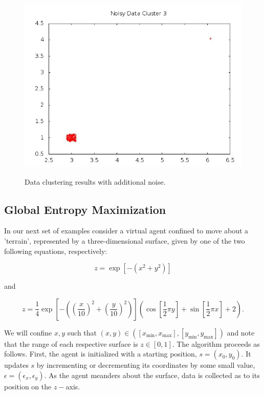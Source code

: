 \documentclass[english]{article}
\begin{document}
\begin{figure}
{\includegraphics[scale=0.25]{sparse_clusters2.jpeg}}\protect\caption{Data clustering results with additional noise.\label{fig:noise}}
\end{figure}



\subsection{Global Entropy Maximization}

In our next set of examples consider a virtual agent confined to move
about a 'terrain', represented by a three-dimensional surface, given
by one of the two following equations, respectively:

\begin{equation}
z=\exp[-(x^{2}+y^{2})]\label{eq:f1}
\end{equation}


and

\begin{equation}
z=\frac{1}{4}\exp[-(\left(\frac{x}{10}\right)^{2}+\left(\frac{y}{10}\right)^{2})](\cos[\frac{1}{2}\pi y]+\sin[\frac{1}{2}\pi x]+2).\label{eq:f2}
\end{equation}


We will confine $x,y$ such that $(x,y)\in([x_{\min},x_{\max}],[y_{\min},y_{\max}])$
and note that the range of each respective surface is $z\in[0,1]$.
The algorithm proceeds as follows. First, the agent is initialized
with a starting position, $s=(x_{0},y_{0})$. It updates $s$ by incrementing
or decrementing its coordinates by some small value, $\epsilon=(\epsilon_{x},\epsilon_{y})$.
As the agent meanders about the surface, data is collected as to its
position on the $z-$axis. 
\end{document}
